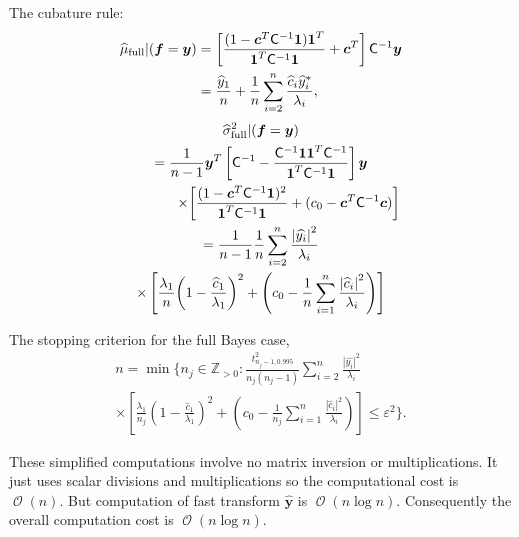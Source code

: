 \documentclass[twocolumn]{svjour3}          %
\DeclareMathOperator{\Order}{{\mathcal O}}
\newcommand{\bm}[1]{\boldsymbol{#1}}
\newcommand{\posIntegers}{\mathbb{Z}_{> 0}}
\newcommand{\vc}{\bm{c}}
\newcommand{\vf}{\bm{f}}
\newcommand{\vy}{\bm{y}}
\newcommand{\vone}{\bm{1}}
\newcommand{\mC}{\mathsf{C}}
\def\abs#1{\ensuremath{\left \lvert #1 \right \rvert}}
\begin{document}
The cubature rule:
\begin{align}\label{FJH:eq:cubFull}
\nonumber
\widehat{\mu}_{\textup{full}}  \vert ( \vf = \vy) &= \left[\frac{(1 -  \vc^T \mC^{-1}\vone)\vone^T}{\vone^T \mC^{-1} \vone} + \vc^T \right] \mC^{-1}  \vy 
\\
& = 
 \frac{\widehat{y}_1}{n} +
 \frac 1n \sum_{i=2}^n \frac{ \widehat{c}_i \widehat{y}_i^*}{\lambda_i},
\end{align}
\begin{multline*} %
\widehat{\sigma}^2_{\textup{full}}  \vert ( \vf = \vy) \\
 = \frac{1}{n-1} 
\vy^T\left[ \mC^{-1} 
- \frac{ \mC^{-1} \vone\vone^T \mC^{-1}}{\vone^T \mC^{-1} \vone}  \right]\vy 
\\
\qquad \qquad \times 
\biggl[\frac{(1 - \vc^T \mC^{-1} \vone)^2}{\vone^T \mC^{-1} \vone} 
 + (c_0  -\vc ^T \mC^{-1} \vc) \biggr] 
\\
 =
\frac{1}{n-1} \frac{1}{n} \sum_{i=2}^n \frac{\abs{\widehat{y_i}}^2}{\lambda_i}
\\
\times
\left[\frac{\lambda_1}{n}{\left(1 - \frac{\widehat{c}_1}{\lambda_1}\right)^2} + \left(c_0  - \frac 1n \sum_{i=1}^n \frac{\abs{\widehat{c}_i}^2}{\lambda_i}\right) \right] 
\end{multline*}

The stopping criterion for the full Bayes case,  
\begin{multline} \label{FJH:eq:stopcritHyper}
n  = \min \biggl \{n_j \in \posIntegers:  
\frac {t_{n_j-1,0.995}^2}{n_j(n_j - 1)} \sum_{i=2}^n \frac{\abs{\widehat{y_i}}^2}{\lambda_i} 
\\ \times
\left[\frac{\lambda_1}{n_j}{\left(1 - \frac{\widehat{c}_1}{\lambda_1}\right)^2} + \left(c_0  - \frac{1}{n_j} \sum_{i=1}^n \frac{\abs{\widehat{c}_i}^2}{\lambda_i}\right) \right] 
\le \varepsilon^2 \biggr\}.
\end{multline}


These simplified computations involve no matrix inversion or multiplications. 
It just uses scalar divisions and multiplications so the computational cost is $\Order(n)$. 
But computation of fast transform $\widehat{\vy}$ is $\Order(n \log n)$.  Consequently the overall computation cost is $\Order(n \log n )$. 
\end{document}
